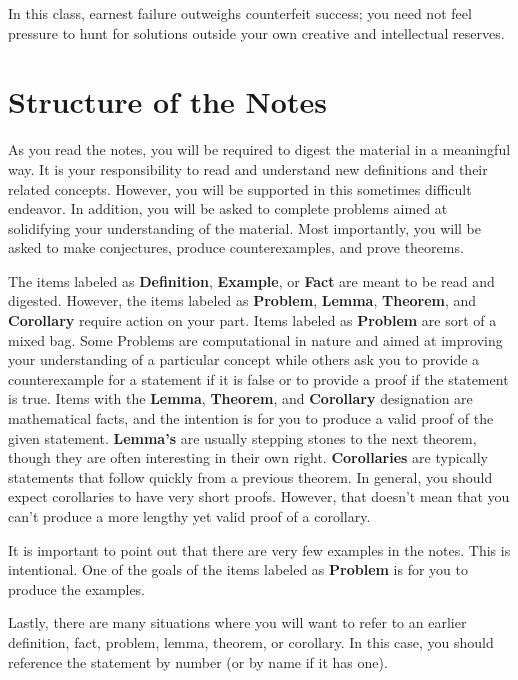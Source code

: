 In this class, earnest failure outweighs counterfeit success; you need not feel pressure to hunt for solutions outside your own creative and intellectual reserves.  

\section{Structure of the Notes}
As you read the notes, you will be required to digest the material in a meaningful way.  It is your responsibility to read and understand new definitions and their related concepts.  However, you will be supported in this sometimes difficult endeavor. In addition, you will be asked to complete problems aimed at solidifying your understanding of the material.  Most importantly, you will be asked to make conjectures, produce counterexamples, and prove theorems.

The items labeled as \textbf{Definition}, \textbf{Example}, or \textbf{Fact} are meant to be read and digested.  However, the items labeled as \textbf{Problem}, \textbf{Lemma}, \textbf{Theorem}, and \textbf{Corollary} require action on your part.  Items labeled as \textbf{Problem} are sort of a mixed bag. Some Problems are computational in nature and aimed at improving your understanding of a particular concept while others ask you to provide a counterexample for a statement if it is false or to provide a proof if the statement is true. Items with the \textbf{Lemma}, \textbf{Theorem}, and \textbf{Corollary} designation are mathematical facts, and the intention is for you to produce a valid proof of the given statement.  \textbf{Lemma's} are usually stepping stones to the next theorem, though they are often  interesting in their own right. \textbf{Corollaries}  are typically statements that follow quickly from a previous theorem. In general, you should expect corollaries to have very short proofs.  However, that doesn't mean that you can't produce a more lengthy yet valid proof of a corollary. 

It is important to point out that there are very few examples in the notes.  This is intentional.  One of the goals of the items labeled as \textbf{Problem} is for you to produce the examples.

Lastly, there are many situations where you will want to refer to an earlier definition, fact, problem, lemma, theorem, or corollary.  In this case, you should reference the statement by number (or by name if it has one).  
